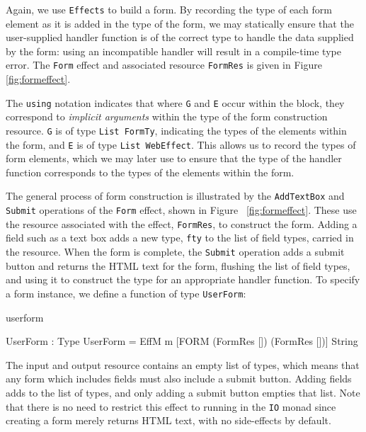 \noindent
Again, we use \texttt{Effects} to build a form.
By recording
the type of each form element as it is added in the type of the form, we may
statically ensure that the user-supplied handler function is of the correct
type to handle the data supplied by the form: using an
incompatible handler will result in a compile-time type error. The \texttt{Form}
effect and associated resource \texttt{FormRes} is given in Figure 
\ref{fig:formeffect}.

The \texttt{using} notation indicates that where \texttt{G} and \texttt{E} occur within the block, they correspond to \emph{implicit arguments} within the type of the form construction resource. 
\texttt{G} is of type \texttt{List FormTy}, indicating the types of the elements within the form, and \texttt{E} is of type \texttt{List WebEffect}. This allows us to record the types of form elements, which we may later use to ensure that the type of the handler function corresponds to the types of the elements within the form.

The general process of form construction is illustrated by the \texttt{AddTextBox}
and \texttt{Submit} operations of the \texttt{Form} effect, shown in Figure ~\ref{fig:formeffect}. These use the resource associated with the effect, \texttt{FormRes}, to construct the form. Adding a field such as a text box adds a new type,
\texttt{fty} to the list of field types, carried in the resource. When the form
is complete, the \texttt{Submit} operation adds a submit button and returns the
HTML text for the form, flushing the list of field types, and using it to
construct the type for an appropriate handler function.
%
To specify a form instance, we define a function of type \texttt{UserForm}:

\begin{SaveVerbatim}{userform}

UserForm : Type
UserForm = EffM m [FORM (FormRes []) 
                        (FormRes [])] String
\end{SaveVerbatim}

\noindent
%
The input and output resource contains an empty list of types, which means that
any form which includes fields must also include a submit button. Adding fields
adds to the list of types, and only adding a submit button empties that list.
Note that there is no need to restrict this effect to running in the \texttt{IO}
monad since creating a form merely returns HTML text, with no side-effects by
default.

